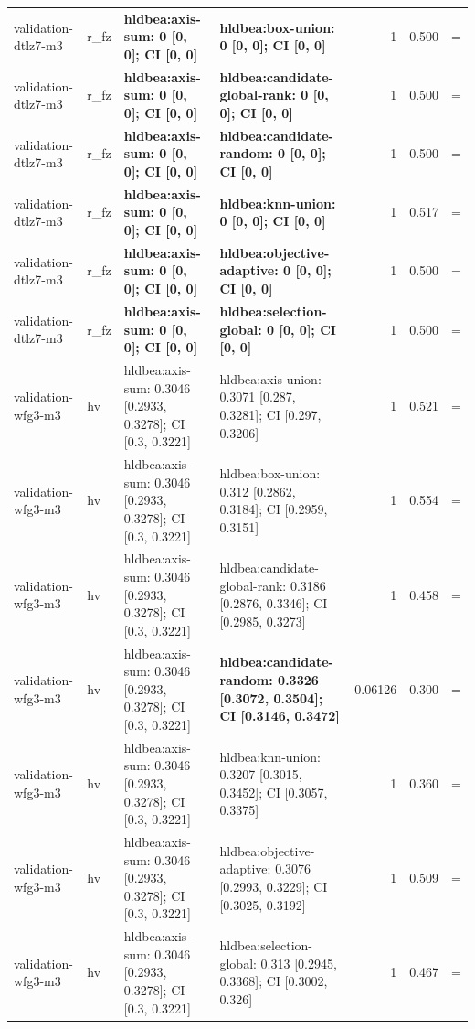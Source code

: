 \begin{tabular}{llllrrc}
validation-dtlz7-m3 & r\_fz & \textbf{hldbea:axis-sum: 0 [0, 0]; CI [0, 0]} & \textbf{hldbea:box-union: 0 [0, 0]; CI [0, 0]} & 1 & 0.500 & = \\
validation-dtlz7-m3 & r\_fz & \textbf{hldbea:axis-sum: 0 [0, 0]; CI [0, 0]} & \textbf{hldbea:candidate-global-rank: 0 [0, 0]; CI [0, 0]} & 1 & 0.500 & = \\
validation-dtlz7-m3 & r\_fz & \textbf{hldbea:axis-sum: 0 [0, 0]; CI [0, 0]} & \textbf{hldbea:candidate-random: 0 [0, 0]; CI [0, 0]} & 1 & 0.500 & = \\
validation-dtlz7-m3 & r\_fz & \textbf{hldbea:axis-sum: 0 [0, 0]; CI [0, 0]} & \textbf{hldbea:knn-union: 0 [0, 0]; CI [0, 0]} & 1 & 0.517 & = \\
validation-dtlz7-m3 & r\_fz & \textbf{hldbea:axis-sum: 0 [0, 0]; CI [0, 0]} & \textbf{hldbea:objective-adaptive: 0 [0, 0]; CI [0, 0]} & 1 & 0.500 & = \\
validation-dtlz7-m3 & r\_fz & \textbf{hldbea:axis-sum: 0 [0, 0]; CI [0, 0]} & \textbf{hldbea:selection-global: 0 [0, 0]; CI [0, 0]} & 1 & 0.500 & = \\
validation-wfg3-m3 & hv & hldbea:axis-sum: 0.3046 [0.2933, 0.3278]; CI [0.3, 0.3221] & hldbea:axis-union: 0.3071 [0.287, 0.3281]; CI [0.297, 0.3206] & 1 & 0.521 & = \\
validation-wfg3-m3 & hv & hldbea:axis-sum: 0.3046 [0.2933, 0.3278]; CI [0.3, 0.3221] & hldbea:box-union: 0.312 [0.2862, 0.3184]; CI [0.2959, 0.3151] & 1 & 0.554 & = \\
validation-wfg3-m3 & hv & hldbea:axis-sum: 0.3046 [0.2933, 0.3278]; CI [0.3, 0.3221] & hldbea:candidate-global-rank: 0.3186 [0.2876, 0.3346]; CI [0.2985, 0.3273] & 1 & 0.458 & = \\
validation-wfg3-m3 & hv & hldbea:axis-sum: 0.3046 [0.2933, 0.3278]; CI [0.3, 0.3221] & \textbf{hldbea:candidate-random: 0.3326 [0.3072, 0.3504]; CI [0.3146, 0.3472]} & 0.06126 & 0.300 & = \\
validation-wfg3-m3 & hv & hldbea:axis-sum: 0.3046 [0.2933, 0.3278]; CI [0.3, 0.3221] & hldbea:knn-union: 0.3207 [0.3015, 0.3452]; CI [0.3057, 0.3375] & 1 & 0.360 & = \\
validation-wfg3-m3 & hv & hldbea:axis-sum: 0.3046 [0.2933, 0.3278]; CI [0.3, 0.3221] & hldbea:objective-adaptive: 0.3076 [0.2993, 0.3229]; CI [0.3025, 0.3192] & 1 & 0.509 & = \\
validation-wfg3-m3 & hv & hldbea:axis-sum: 0.3046 [0.2933, 0.3278]; CI [0.3, 0.3221] & hldbea:selection-global: 0.313 [0.2945, 0.3368]; CI [0.3002, 0.326] & 1 & 0.467 & = \\

\end{tabular}
